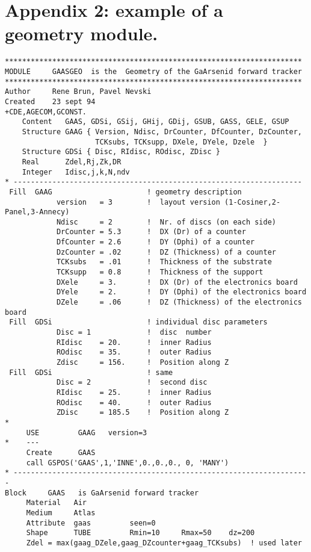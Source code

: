 
\newpage 
\section*{Appendix 2: example of a  geometry module.}
\vspace{0.3cm}
\begin{verbatim}
*********************************************************************
MODULE     GAASGEO  is the  Geometry of the GaArsenid forward tracker
*********************************************************************
Author     Rene Brun, Pavel Nevski
Created    23 sept 94
+CDE,AGECOM,GCONST.
    Content   GAAS, GDSi, GSij, GHij, GDij, GSUB, GASS, GELE, GSUP
    Structure GAAG { Version, Ndisc, DrCounter, DfCounter, DzCounter,
                     TCKsubs, TCKsupp, DXele, DYele, Dzele  }
    Structure GDSi { Disc, RIdisc, ROdisc, ZDisc }
    Real      Zdel,Rj,Zk,DR
    Integer   Idisc,j,k,N,ndv
* -------------------------------------------------------------------
 Fill  GAAG                      ! geometry description
            version   = 3        !  layout version (1-Cosiner,2-Panel,3-Annecy)
            Ndisc     = 2        !  Nr. of discs (on each side)
            DrCounter = 5.3      !  DX (Dr) of a counter
            DfCounter = 2.6      !  DY (Dphi) of a counter
            DzCounter = .02      !  DZ (Thickness) of a counter
            TCKsubs   = .01      !  Thickness of the substrate
            TCKsupp   = 0.8      !  Thickness of the support
            DXele     = 3.       !  DX (Dr) of the electronics board
            DYele     = 2.       !  DY (Dphi) of the electronics board
            DZele     = .06      !  DZ (Thickness) of the electronics board
 Fill  GDSi                      ! individual disc parameters
            Disc = 1             !  disc  number
            RIdisc    = 20.      !  inner Radius
            ROdisc    = 35.      !  outer Radius
            Zdisc     = 156.     !  Position along Z
 Fill  GDSi                      ! same
            Disc = 2             !  second disc
            RIdisc    = 25.      !  inner Radius
            ROdisc    = 40.      !  outer Radius
            ZDisc     = 185.5    !  Position along Z
*
     USE         GAAG   version=3
*    ---
     Create      GAAS
     call GSPOS('GAAS',1,'INNE',0.,0.,0., 0, 'MANY')
* ---------------------------------------------------------------------
Block     GAAS   is GaArsenid forward tracker
     Material   Air
     Medium     Atlas
     Attribute  gaas         seen=0
     Shape      TUBE         Rmin=10     Rmax=50    dz=200
     Zdel = max(gaag_DZele,gaag_DZcounter+gaag_TCKsubs)  ! used later


\end{verbatim}
